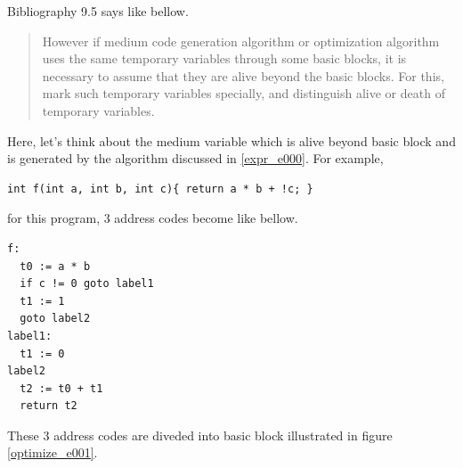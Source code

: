 \label{optimize_e004}
Bibliography \cite{doragon} 9.5 says like bellow.
\begin{quote}
However if medium code generation algorithm or optimization algorithm
uses the same temporary variables through some basic blocks,
it is necessary to assume that they are alive beyond the basic blocks.
For this, mark such temporary variables specially, and distinguish
alive or death of temporary variables.
\end{quote}
Here, let's think about the medium variable which is alive beyond
basic block and is generated by the algorithm discussed in \ref{expr_e000}.
For example,
\begin{verbatim}
int f(int a, int b, int c){ return a * b + !c; }
\end{verbatim}
for this program, 3 address codes become like bellow.
\begin{verbatim}
f:
  t0 := a * b
  if c != 0 goto label1
  t1 := 1
  goto label2
label1:
  t1 := 0
label2
  t2 := t0 + t1
  return t2
\end{verbatim}
These 3 address codes are diveded into basic block illustrated in
figure \ref{optimize_e001}.
